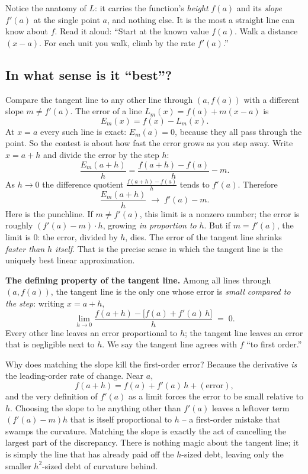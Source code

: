 Notice the anatomy of $L$: it carries the function's \emph{height} $f(a)$ and its
\emph{slope} $f'(a)$ at the single point $a$, and nothing else. It is the most a
straight line can know about $f$. Read it aloud: ``Start at the known value
$f(a)$. Walk a distance $(x-a)$. For each unit you walk, climb by the rate
$f'(a)$.''

\subsection{In what sense is it ``best''?}

Compare the tangent line to any other line through $(a,f(a))$ with a different
slope $m\neq f'(a)$. The error of a line $L_m(x)=f(a)+m(x-a)$ is
\[
E_m(x) = f(x) - L_m(x).
\]
At $x=a$ every such line is exact: $E_m(a)=0$, because they all pass through the
point. So the contest is about how fast the error grows as you step away. Write
$x = a+h$ and divide the error by the step $h$:
\[
\frac{E_m(a+h)}{h} = \frac{f(a+h)-f(a)}{h} - m.
\]
As $h\to 0$ the difference quotient $\frac{f(a+h)-f(a)}{h}$ tends to $f'(a)$.
Therefore
\[
\frac{E_m(a+h)}{h} \;\longrightarrow\; f'(a)-m.
\]
Here is the punchline. If $m\neq f'(a)$, this limit is a nonzero number; the
error is roughly $(f'(a)-m)\cdot h$, growing \emph{in proportion to} $h$. But if
$m=f'(a)$, the limit is $0$: the error, divided by $h$, dies. The error of the
tangent line shrinks \emph{faster than $h$ itself}. That is the precise sense in
which the tangent line is the uniquely best linear approximation.

\begin{focusbox}
\textbf{The defining property of the tangent line.} Among all lines through
$(a,f(a))$, the tangent line is the only one whose error is \emph{small compared
to the step}: writing $x=a+h$,
\[
\lim_{h\to 0}\frac{f(a+h) - \big[f(a)+f'(a)\,h\big]}{h} \;=\; 0.
\]
Every other line leaves an error proportional to $h$; the tangent line leaves an
error that is negligible next to $h$. We say the tangent line agrees with $f$ ``to
first order.''
\end{focusbox}

\begin{whybox}
Why does matching the slope kill the first-order error? Because the derivative
\emph{is} the leading-order rate of change. Near $a$,
\[
f(a+h) = f(a) + f'(a)\,h + (\text{error}),
\]
and the very definition of $f'(a)$ as a limit forces the error to be small
relative to $h$. Choosing the slope to be anything other than $f'(a)$ leaves a
leftover term $(f'(a)-m)h$ that is itself proportional to $h$ -- a first-order
mistake that swamps the curvature. Matching the slope is exactly the act of
cancelling the largest part of the discrepancy. There is nothing magic about the
tangent line; it is simply the line that has already paid off the $h$-sized debt,
leaving only the smaller $h^2$-sized debt of curvature behind.
\end{whybox}

